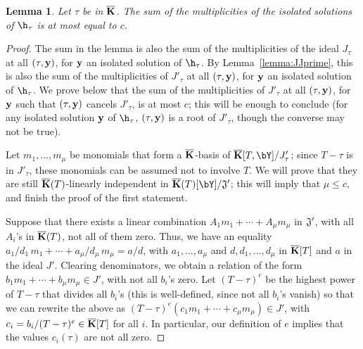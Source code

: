 \documentclass[12pt]{article}
\newtheorem{lemma}[definition]{Lemma}
\begin{document}
\begin{lemma}\label{lemma:19}
  Let $\tau$ be in $\overline{\mathbf{K}}$. The sum of the multiplicities of the
  isolated solutions of $\h_\tau$ is at most equal to $c$.
\end{lemma}
\begin{proof}
  The sum in the lemma is also the sum of the multiplicities of the
  ideal $J_\tau$ at all $(\tau,\mathbf{y})$, for $\mathbf{y}$ an isolated solution of
  $\h_\tau$.  By Lemma~\ref{lemma:JJprime}, this is also the sum of
  the multiplicities of $J'_\tau$ at all $(\tau,\mathbf{y})$, for $\mathbf{y}$ an
  isolated solution of $\h_\tau$. We prove below that the sum of the
  multiplicities of $J'_\tau$ at all $(\tau,\mathbf{y})$, for $\mathbf{y}$ such that
  $(\tau,\mathbf{y})$ cancels $J'_\tau$, is at most $c$; this will be enough
  to conclude (for any isolated solution $\mathbf{y}$ of $\h_\tau$,
  $(\tau,\mathbf{y})$ is a root of $J'_\tau$, though the converse may not be
  true).
  
  Let $m_1,\dots,m_\mu$ be monomials that form a $\overline{\mathbf{K}}$-basis of
  $\KKbar[T,\bY]/J'_\tau$; since $T-\tau$ is in $J'_\tau$, these
  monomials can be assumed not to involve $T$.  We will prove that
  they are still $\overline{\mathbf{K}}(T)$-linearly independent in
  $\KKbar(T)[\bY]/{\frak J}'$; this will imply that $\mu \le c$,
  and finish the proof of the first statement.
  
  Suppose that there exists a linear combination $A_1 m_1 + \cdots +
  A_\mu m_\mu$ in ${\frak J}'$, with all $A_i$'s in $\overline{\mathbf{K}}(T)$, not
  all of them zero. Thus, we have an equality $a_1/d_1\, m_1 + \cdots
  + a_\mu/d_\mu\, m_\mu = a/d$, with $a_1,\dots,a_\mu$ and
  $d,d_1,\dots,d_\mu$ in $\overline{\mathbf{K}}[T]$ and $a$ in the ideal
  $J'$. Clearing denominators, we obtain a relation of the form $b_1
  m_1 +\cdots+ b_\mu m_\mu \in J'$, with not all $b_i$'s zero. Let
  $(T-\tau)^e$ be the highest power of $T-\tau$ that divides all
  $b_i$'s (this is well-defined, since not all $b_i$'s vanish) so that
  we can rewrite the above as $(T-\tau)^e (c_1 m_1 +\cdots+ c_\mu
  m_\mu) \in J'$, with $c_i=b_i/(T-\tau)^e \in \overline{\mathbf{K}}[T]$ for all $i$.
  In particular, our definition of $e$ implies that the values
  $c_i(\tau)$ are not all zero.




\end{proof}
\end{document}
